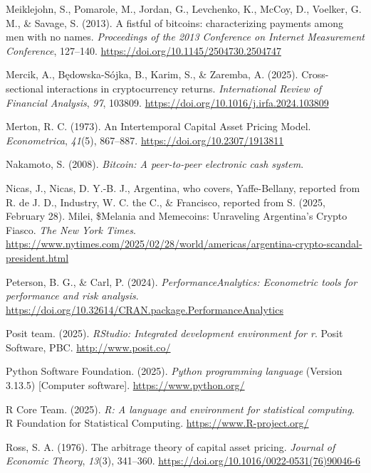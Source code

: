 \documentclass[
  12pt,
  a4paper,
  openany]{scrbook}
\newlength{\cslhangindent}
\newenvironment{CSLReferences}[2] %
 {\begin{list}{}{%
  \setlength{\itemindent}{0pt}
  \setlength{\leftmargin}{0pt}
  \setlength{\parsep}{0pt}
  \ifodd #1
   \setlength{\leftmargin}{\cslhangindent}
   \setlength{\itemindent}{-1\cslhangindent}
  \fi
  \setlength{\itemsep}{#2\baselineskip}}}
 {\end{list}}
\begin{document}
\begin{CSLReferences}{1}{0}
Meiklejohn, S., Pomarole, M., Jordan, G., Levchenko, K., McCoy, D.,
Voelker, G. M., \& Savage, S. (2013). A fistful of bitcoins:
characterizing payments among men with no names. \emph{Proceedings of
the 2013 Conference on Internet Measurement Conference}, 127--140.
\url{https://doi.org/10.1145/2504730.2504747}

Mercik, A., Będowska-Sójka, B., Karim, S., \& Zaremba, A. (2025).
Cross-sectional interactions in cryptocurrency returns.
\emph{International Review of Financial Analysis}, \emph{97}, 103809.
\url{https://doi.org/10.1016/j.irfa.2024.103809}

Merton, R. C. (1973). An Intertemporal Capital Asset Pricing Model.
\emph{Econometrica}, \emph{41}(5), 867--887.
\url{https://doi.org/10.2307/1913811}

Nakamoto, S. (2008). \emph{Bitcoin: A peer-to-peer electronic cash
system}.

Nicas, J., Nicas, D. Y.-B. J., Argentina, who covers, Yaffe-Bellany,
reported from R. de J. D., Industry, W. C. the C., \& Francisco,
reported from S. (2025, February 28). Milei, \$Melania and Memecoins:
Unraveling Argentina's Crypto Fiasco. \emph{The New York Times}.
\url{https://www.nytimes.com/2025/02/28/world/americas/argentina-crypto-scandal-president.html}

Peterson, B. G., \& Carl, P. (2024). \emph{{PerformanceAnalytics}:
Econometric tools for performance and risk analysis}.
\url{https://doi.org/10.32614/CRAN.package.PerformanceAnalytics}

Posit team. (2025). \emph{{RStudio}: Integrated development environment
for r}. Posit Software, PBC. \url{http://www.posit.co/}

Python Software Foundation. (2025). \emph{Python programming language}
(Version 3.13.5) {[}Computer software{]}. \url{https://www.python.org/}

R Core Team. (2025). \emph{R: A language and environment for statistical
computing}. R Foundation for Statistical Computing.
\url{https://www.R-project.org/}

Ross, S. A. (1976). The arbitrage theory of capital asset pricing.
\emph{Journal of Economic Theory}, \emph{13}(3), 341--360.
\url{https://doi.org/10.1016/0022-0531(76)90046-6}


\end{CSLReferences}
\end{document}
